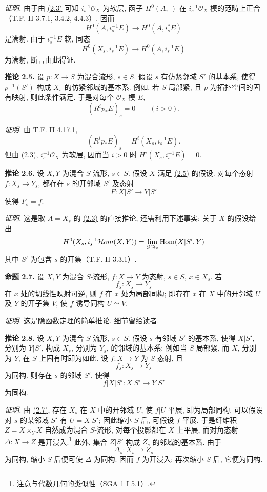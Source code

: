 \emph{证明.} 由于由 \hyperlink{sga6.e02.cor.2-3}{(2.3)} 可知 $i_s^{-1}\mathcal O_X$ 为软层, 函子 $H^0(A,\ )$ 在 $i_s^{-1}\mathcal O_X$-模的范畴上正合（T.F. II 3.7.1, 3.4.2, 4.4.3）. 因而
\[
 H^0(A,i_s^{-1}E)\longrightarrow H^0(A,i_s^*E)
\]
是满射. 由于 $i_s^{-1}E$ 软, 同态
\[
 H^0(X_s,i_s^{-1}E)\longrightarrow H^0(A,i_s^{-1}E)
\]
为满射, 断言由此得证.

\textbf{推论 2.5.} 设 $p:X\to S$ 为混合流形, $s\in S$. 假设 $s$ 有仿紧邻域 $S'$ 的基本系, 使得 $p^{-1}(S')$ 构成 $X_s$ 的仿紧邻域的基本系. 例如, 若 $S$ 局部紧, 且 $p$ 为拓扑空间的固有映射, 则此条件满足. 于是对每个 $\mathcal O_X$-模 $E$,
\[
 (R^ip_*E)_s=0\qquad(i>0).
\]

\emph{证明.} 由 T.F. II 4.17.1,
\[
 (R^ip_*E)_s=H^i(X_s,i_s^{-1}E).
\]
但由 \hyperlink{sga6.e02.cor.2-3}{(2.3)}, $i_s^{-1}\mathcal O_X$ 为软层, 因而当 $i>0$ 时 $H^i(X_s,i_s^{-1}E)=0$.

\textbf{推论 2.6.} 设 $X,Y$ 为混合 $S$-流形, $s\in S$. 假设 $X$ 满足 \hyperlink{sga6.e02.cor.2-5}{(2.5)} 的假设. 对每个态射 $f:X_s\to Y_s$, 都存在 $s$ 的开邻域 $S'$ 及态射
\[
 F:X|S'\longrightarrow Y|S'
\]
使得 $F_s=f$.

\emph{证明.} 这是取 $A=X_s$ 的 \hyperlink{sga6.e02.cor.2-3}{(2.3)} 的直接推论, 还需利用下述事实: 关于 $X$ 的假设给出
\[
 H^0(X_s,i_s^{-1}\mathcal Hom(X,Y))
 =\operatorname*{lim}_{S'\ni s}\operatorname{Hom}(X|S',Y)
\]
其中 $S'$ 为包含 $s$ 的开集（T.F. II 3.3.1）.

\textbf{命题 2.7.} 设 $X,Y$ 为混合 $S$-流形, $f:X\to Y$ 为态射, $s\in S$, $x\in X_s$. 若
\[
 f_s:X_s\longrightarrow Y_s
\]
在 $x$ 处的切线性映射可逆, 则 $f$ 在 $x$ 处为局部同构; 即存在 $x$ 在 $X$ 中的开邻域 $U$ 及 $Y$ 的开子集 $V$, 使 $f$ 诱导同构 $U\simeq V$.

\emph{证明.} 这是隐函数定理的简单推论. 细节留给读者.

\textbf{推论 2.8.} 设 $X,Y$ 为混合 $S$-流形, $s\in S$. 假设 $s$ 有邻域 $S'$ 的基本系, 使得 $X|S'$, 分别为 $Y|S'$, 构成 $X_s$, 分别为 $Y_s$, 的邻域的基本系; 例如当 $S$ 局部紧, 而 $X$, 分别为 $Y$, 在 $S$ 上固有时即为如此. 设 $f:X\to Y$ 为 $S$-态射, 且
\[
 f_s:X_s\longrightarrow Y_s
\]
为同构. 则存在 $s$ 的邻域 $S'$, 使得
\[
 f|X|S':X|S'\longrightarrow Y|S'
\]
为同构.

\emph{证明.} 由 \hyperlink{sga6.e02.prop.2-7}{(2.7)}, 存在 $X_s$ 在 $X$ 中的开邻域 $U$, 使 $f|U$ 平展, 即为局部同构. 可以假设对 $s$ 的某邻域 $S'$ 有 $U=X|S'$; 因此缩小 $S$ 后, 可假设 $f$ 平展. 于是纤维积 $Z=X\times_YX$ 自然成为混合 $S$-流形, 对每个投影都在 $X$ 上平展, 而对角态射 $\Delta:X\to Z$ 是开浸入.\footnote{注意与代数几何的类似性（SGA 1 I 5.1）.} 此外, 集合 $Z|S'$ 构成 $Z_s$ 的邻域的基本系. 由于
\[
 \Delta_s:X_s\longrightarrow Z_s
\]
为同构, 缩小 $S$ 后便可使 $\Delta$ 为同构. 因而 $f$ 为开浸入; 再次缩小 $S$ 后, 它便为同构.

